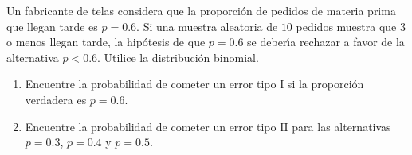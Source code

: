 \begin{enunciado}
 Un fabricante de telas considera que la proporci\'on de pedidos de materia prima que llegan tarde es $p = 0.6$. Si una muestra aleatoria de $10$ pedidos muestra que $3$ o menos llegan tarde, la hip\'otesis de que $p = 0.6$ se deber\'{\i}a rechazar a favor de la alternativa $p < 0.6$. Utilice la distribuci\'on binomial.
 \begin{enumerate}
  \item Encuentre la probabilidad de cometer un error tipo I si la proporci\'on verdadera es $p = 0.6$.
  
  \item Encuentre la probabilidad de cometer un error tipo II para las alternativas $p = 0.3$, $p = 0.4$ y $p = 0.5$.
 \end{enumerate}

\end{enunciado}

